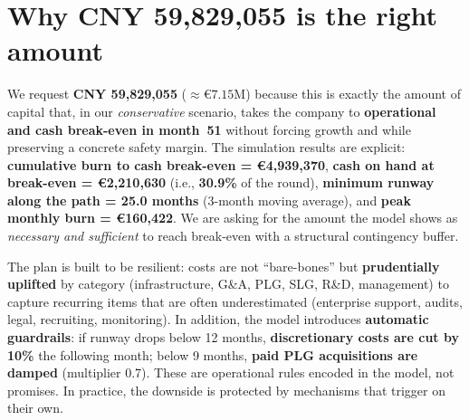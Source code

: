 \begin{table}[H]
\centering
\caption{Key Financial Metrics}
\label{tab:financial_metrics}
\end{table}

\newpage
\section{Why CNY 59{,}829{,}055 is the right amount}

We request \textbf{CNY 59{,}829{,}055} ($\approx€7.15\text{M}$) because this is exactly the amount of capital that, in our \emph{conservative} scenario, takes the company to \textbf{operational and cash break-even in month~51} without forcing growth and while preserving a concrete safety margin. The simulation results are explicit: \textbf{cumulative burn to cash break-even = €4{,}939{,}370}, \textbf{cash on hand at break-even = €2{,}210{,}630} (i.e., \textbf{30.9\%} of the round), \textbf{minimum runway along the path = 25.0 months} (3-month moving average), and \textbf{peak monthly burn = €160{,}422}. We are asking for the amount the model shows as \emph{necessary and sufficient} to reach break-even with a structural contingency buffer.

The plan is built to be resilient: costs are not ``bare-bones'' but \textbf{prudentially uplifted} by category (infrastructure, G\&A, PLG, SLG, R\&D, management) to capture recurring items that are often underestimated (enterprise support, audits, legal, recruiting, monitoring). In addition, the model introduces \textbf{automatic guardrails}: if runway drops below 12 months, \textbf{discretionary costs are cut by 10\%} the following month; below 9 months, \textbf{paid PLG acquisitions are damped} (multiplier 0.7). These are operational rules encoded in the model, not promises. In practice, the downside is protected by mechanisms that trigger on their own.

